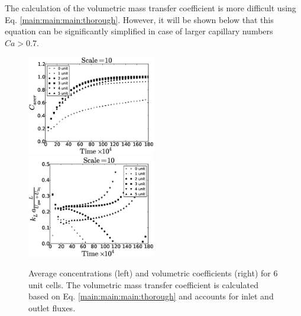 \documentclass{article}
\begin{document}
The calculation of the  volumetric mass transfer coefficient is more difficult
using Eq. \ref{main:main:main:thorough}. However, it will be shown below that
this equation can be significantly simplified in case of larger capillary
numbers $Ca>0.7$.

\begin{figure}[htb!]
\includegraphics[width=0.5\textwidth]{Figures/aver_units6scale10.eps}\hfill
\includegraphics[width=0.5\textwidth]{Figures/right_def_6scale10.eps}\\
\caption{Average concentrations (left) and volumetric coefficients (right) for $6$ unit cells. The
volumetric
mass transfer coefficient is calculated based on Eq. \ref{main:main:main:thorough} and accounts for inlet
and outlet fluxes. \label{fig:unit:6}}
\end{figure}
\end{document}

